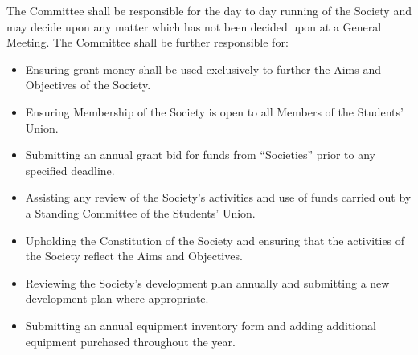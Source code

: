 \begin{clause}
	The Committee shall be responsible for the day to day running of the Society and may decide upon any matter which has not been decided upon at a General Meeting. The Committee shall be further responsible for:
	\begin{itemize}
		\item Ensuring grant money shall be used exclusively to further the Aims and Objectives of the Society.
		\item Ensuring Membership of the Society is open to all Members of the Students' Union.
		\item Submitting an annual grant bid for funds from ``Societies'' prior to any specified deadline.
		\item Assisting any review of the Society's activities and use of funds carried out by a Standing Committee of the Students' Union.
		\item Upholding the Constitution of the Society and ensuring that the activities of the Society reflect the Aims and Objectives.
		\item Reviewing the Society's development plan annually and submitting a new development plan where appropriate.
		\item Submitting an annual equipment inventory form and adding additional equipment purchased throughout the year.
	\end{itemize}
\end{clause}